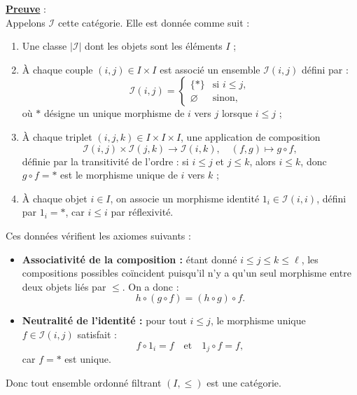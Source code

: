 \documentclass[a4paper, 14pt]{report}
\begin{document}
\begin{onehalfspace}
{			\textbf{\underline{Preuve}} : \\
			Appelons \( \mathcal{I} \)  cette catégorie. Elle est donnée comme suit :
			\begin{enumerate}[label=\roman*)]
				\item Une classe \( |\mathcal{I}| \) dont les objets sont les éléments  \( I \) ;
				\item À chaque couple \( (i, j) \in I \times I \) est associé un ensemble \( \mathcal{I}(i, j) \) défini par :
				\[
				\mathcal{I}(i, j) =
				\begin{cases}
					\{\ast\} & \text{si } i \leq j, \\
					\varnothing & \text{sinon},
				\end{cases}
				\]
				où \( \ast \) désigne un unique morphisme de \( i \) vers \( j \) lorsque \( i \leq j \) ;
				\item À chaque triplet \( (i, j, k) \in I\times I\times I \), une application de composition
				\[
				\mathcal{I}(i, j) \times \mathcal{I}(j, k) \to \mathcal{I}(i, k), \quad (f, g) \mapsto g \circ f,
				\]
				définie par la transitivité de l’ordre : si \( i \leq j \) et \( j \leq k \), alors \( i \leq k \), donc \( g \circ f = \ast \) est le morphisme unique de \( i \) vers \( k \) ;
				\item À chaque objet \( i \in I \), on associe un morphisme identité \( 1_i \in \mathcal{I}(i, i) \), défini par \( 1_i = \ast \), car \( i \leq i \) par réflexivité.
			\end{enumerate}
			
			Ces données vérifient les axiomes suivants :
			\begin{itemize}
				\item \textbf{Associativité de la composition :} étant donné \( i \leq j \leq k \leq \ell \), les compositions possibles coïncident puisqu'il n’y a qu’un seul morphisme entre deux objets liés par \( \leq \). On a donc :
				\[
				h \circ (g \circ f) = (h \circ g) \circ f.
				\]
				\item \textbf{Neutralité de l'identité :} pour tout \( i \leq j \), le morphisme unique \( f \in \mathcal{I}(i, j) \) satisfait :
				\[
				f \circ 1_i = f \quad \text{et} \quad 1_j \circ f = f,
				\]
				car \( f = \ast \) est unique.
			\end{itemize}
			Donc tout ensemble ordonné filtrant \( (I, \leq) \) est une catégorie.
			
			
			
}
\end{onehalfspace}
\end{document}
